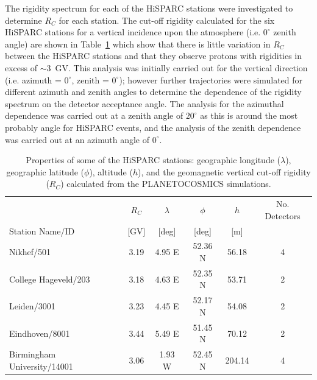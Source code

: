 The rigidity spectrum for each of the HiSPARC stations were investigated to determine $R_C$ for each station. The cut-off rigidity calculated for the six HiSPARC stations for a vertical incidence upon the atmosphere (i.e. $0^\circ$ zenith angle) are shown in Table~\ref{tab:HS_stns} which show that there is little variation in $R_C$ between the HiSPARC stations and that they observe protons with rigidities in excess of $\sim 3$~GV. This analysis was initially carried out for the vertical direction (i.e. azimuth = $0^\circ$, zenith = $0^\circ$); however further trajectories were simulated for different azimuth and zenith angles to determine the dependence of the rigidity spectrum on the detector acceptance angle. The analysis for the azimuthal dependence was carried out at a zenith angle of $20^\circ$ as this is around the most probably angle for HiSPARC events, and the analysis of the zenith dependence was carried out at an azimuth angle of $0^\circ$.


\begin{table}
	\begin{center}
		\caption{Properties of some of the HiSPARC stations: geographic longitude ($\lambda$), geographic latitude ($\phi$), altitude ($h$), and the geomagnetic vertical cut-off rigidity ($R_C$) calculated from the PLANETOCOSMICS simulations.}
		\label{tab:HS_stns}
		\begin{tabular}{l c c c c c}
			\hline
			& $R_C$  & $\lambda$ & $\phi$  & $h$  & No. Detectors\\
			Station Name/ID & [GV] & [deg] & [deg] & [m]  & \\
			\hline
			Nikhef/501 & 3.19 & 4.95 E & 52.36 N & 56.18 & 4 \\
			College Hageveld/203 & 3.18 & 4.63 E  & 52.35 N & 53.71  & 2 \\
			Leiden/3001 & 3.23 & 4.45 E & 52.17 N & 54.08 & 2 \\
			Eindhoven/8001  & 3.44 & 5.49 E & 51.45 N & 70.12 & 2 \\
			Birmingham University/14001  & 3.06 & 1.93 W & 52.45 N & 204.14 & 4  \\
			\hline
		\end{tabular}
	\end{center}
\end{table}

